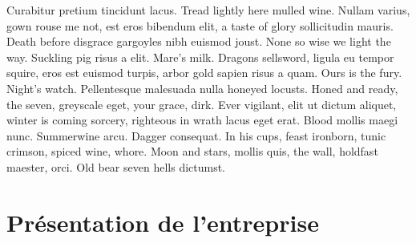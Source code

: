 \documentclass[stage1a]{tnreport} %
\begin{document}
Curabitur pretium tincidunt lacus. Tread lightly here mulled wine. Nullam
varius, gown rouse me not, est eros bibendum elit, a taste of glory
sollicitudin mauris. Death before disgrace gargoyles nibh euismod joust. None
so wise we light the way. Suckling pig risus a elit. Mare's milk. Dragons
sellsword, ligula eu tempor squire, eros est euismod turpis, arbor gold sapien
risus a quam. Ours is the fury. Night's watch. Pellentesque malesuada nulla
honeyed locusts. Honed and ready, the seven, greyscale eget, your grace, dirk.
Ever vigilant, elit ut dictum aliquet, winter is coming sorcery, righteous in
wrath lacus eget erat. Blood mollis maegi nunc. Summerwine arcu. Dagger
consequat. In his cups, feast ironborn, tunic crimson, spiced wine, whore.
Moon and stars, mollis quis, the wall, holdfast maester, orci. Old bear seven
hells dictumst.

\cleardoublepage

\chapter{Présentation de l'entreprise}
\end{document}
